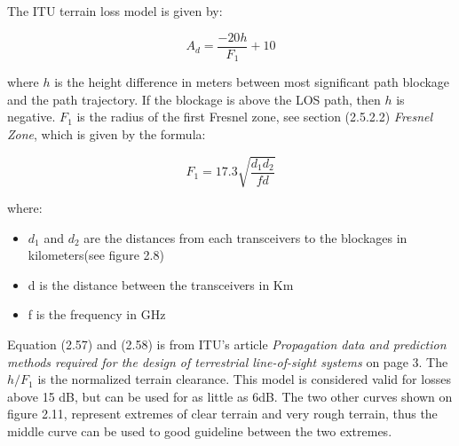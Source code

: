 The ITU terrain loss model is given by:

\begin{equation}
    A_d = \frac{-20h}{F_1}+10
\end{equation}

where $h$ is the height difference in meters between most significant path blockage and the path trajectory. If the blockage is above the LOS path, then $h$ is negative. $F_1$ is the radius of the first Fresnel zone, see section (2.5.2.2) \textit{Fresnel Zone}, which is given by the formula:

\begin{equation}
    F_1 = 17.3 \sqrt{\frac{d_1d_2}{fd}}
\end{equation}

where:

\begin{itemize}
  \item $d_1$ and $d_2$ are the distances from each transceivers to the blockages in kilometers(see figure 2.8)
  \item d is the distance between the transceivers in Km
  \item f is the frequency in GHz
\end{itemize}

Equation (2.57) and (2.58) is from ITU's article \textit{Propagation data and prediction methods required for the design of terrestrial line-of-sight systems}\cite{ITUTerrain} on page 3. The $h/F_1$ is the normalized terrain clearance. This model is considered valid for losses above 15 dB, but can be used for as little as 6dB. The two other curves shown on figure 2.11, represent extremes of clear terrain and very rough terrain, thus the middle curve can be used to good guideline between the two extremes.  

